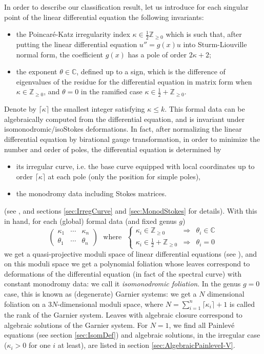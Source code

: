 \documentclass[12]{amsart}
\begin{document}
In order to describe our classification result, let us introduce for each singular point of the linear differential
equation the following invariants:
\begin{itemize}
\item the Poincar\'e-Katz irregularity index $\kappa\in\frac{1}{2}\mathbb Z_{\ge0}$ which is such that,
after putting the linear differential equation $u''=g(x)u$ into Sturm-Liouville normal form,
the coefficient $g(x)$ has a pole of order $2\kappa+2$; 
\item the exponent $\theta\in\mathbb C$, defined up to a sign, which is the difference of eigenvalues
of the residue for the differential equation in matrix form when $\kappa\in\mathbb Z_{\ge0}$, and 
$\theta=0$ in the ramified case $\kappa\in\frac{1}{2}+\mathbb Z_{\ge0}$.
\end{itemize}
Denote by $\lceil\kappa\rceil$ the smallest integer satisfying $\kappa\le k$.
This formal data can be algebraically computed from the differential equation, and is invariant under isomonodromic/isoStokes deformations. In fact, after normalizing the linear differential equation by birational gauge transformation,
in order to minimize the number and order of poles, the differential equation is determined by 
\begin{itemize}
\item its irregular curve, i.e. the base curve equipped with local coordinates up to order $\lceil\kappa\rceil$ at each pole
(only the position for simple poles),
\item the monodromy data including Stokes matrices.
\end{itemize}
(see \cite{MRGalois,Krichever,BMM,vdPS}, and sections \ref{sec:IrregCurve} and \ref{sec:MonodStokes} for details).
With this in hand, for each (global) formal data (and fixed genus $g$)
$$\begin{pmatrix}\kappa_1&\cdots&\kappa_n\\
\theta_1&\cdots&\theta_n\end{pmatrix}\ \ \ \text{where}\ \ \ 
\left\{\begin{matrix}
\kappa_i\in\mathbb Z_{\ge0}&\Rightarrow&\theta_i\in\mathbb C\\
\kappa_i\in\frac{1}{2}+\mathbb Z_{\ge0}&\Rightarrow&\theta_i=0
\end{matrix}\right.$$
we get a quasi-projective moduli space of linear differential equations (see \cite{InabaSaito,Inaba}), 
and on this moduli space we get a polynomial foliation whose leaves
correspond to deformations of the differential equation (in fact of the spectral curve)
with constant monodromy data: we call it {\it isomonodromic foliation}. In the genus $g=0$ case, this is known as (degenerate) 
Garnier systems: we get a $N$ dimensional foliation on a $3N$-dimensional moduli space,
where $N=\sum_{i=1}^n \lceil\kappa_i\rceil+1$ is called the rank of the Garnier system. 
Leaves with algebraic closure correspond to algebraic solutions of the Garnier system.
For $N=1$, we find all Painlev\'e equations (see section \ref{sec:IsomDef}) and algebraic solutions,
in the irregular case ($\kappa_i>0$ for one $i$ at least), are listed in section \ref{sec:AlgebraicPainleveI-V}.
\end{document}
